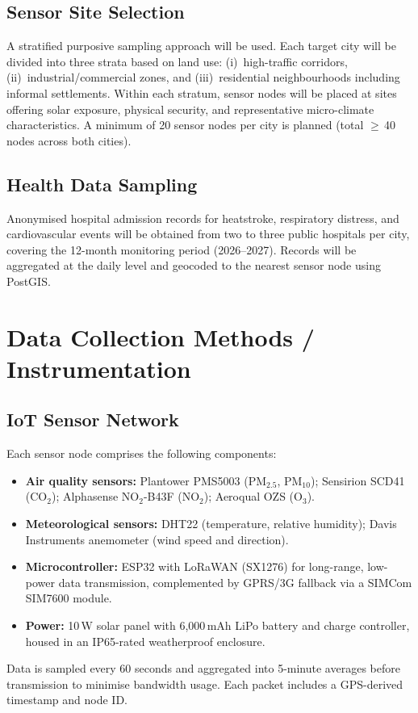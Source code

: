 \subsection{Sensor Site Selection}
A stratified purposive sampling approach will be used. Each target city will be divided into three strata based on land use: (i)~high-traffic corridors, (ii)~industrial/commercial zones, and (iii)~residential neighbourhoods including informal settlements. Within each stratum, sensor nodes will be placed at sites offering solar exposure, physical security, and representative micro-climate characteristics. A minimum of 20 sensor nodes per city is planned (total $\geq$\,40 nodes across both cities).

\subsection{Health Data Sampling}
Anonymised hospital admission records for heatstroke, respiratory distress, and cardiovascular events will be obtained from two to three public hospitals per city, covering the 12-month monitoring period (2026--2027). Records will be aggregated at the daily level and geocoded to the nearest sensor node using PostGIS.

\section{Data Collection Methods / Instrumentation}

\subsection{IoT Sensor Network}
Each sensor node comprises the following components:
\begin{itemize}[leftmargin=*, itemsep=4pt]
  \item \textbf{Air quality sensors:} Plantower PMS5003 (PM$_{2.5}$, PM$_{10}$); Sensirion SCD41 (CO$_2$); Alphasense NO$_2$-B43F (NO$_2$); Aeroqual OZS (O$_3$).
  \item \textbf{Meteorological sensors:} DHT22 (temperature, relative humidity); Davis Instruments anemometer (wind speed and direction).
  \item \textbf{Microcontroller:} ESP32 with LoRaWAN (SX1276) for long-range, low-power data transmission, complemented by GPRS/3G fallback via a SIMCom SIM7600 module.
  \item \textbf{Power:} 10\,W solar panel with 6,000\,mAh LiPo battery and charge controller, housed in an IP65-rated weatherproof enclosure.
\end{itemize}
Data is sampled every 60 seconds and aggregated into 5-minute averages before transmission to minimise bandwidth usage. Each packet includes a GPS-derived timestamp and node ID.

